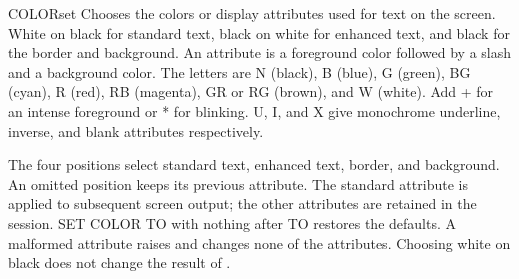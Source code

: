 \begin{XbaseEntry}{COLOR}{set}
Chooses the colors or display attributes used for text on the screen.
\Syntax
{}
\Defaults
White on black for standard text, black on white for enhanced text, and black
for the border and background.
\Usage
An attribute is a foreground color followed by a slash and a background color.
The letters are N (black), B (blue), G (green), BG (cyan), R (red), RB
(magenta), GR or RG (brown), and W (white). Add + for an intense foreground
or * for blinking. U, I, and X give monochrome underline, inverse, and blank
attributes respectively.

The four positions select standard text, enhanced text, border, and background.
An omitted position keeps its previous attribute. The standard attribute is
applied to subsequent screen output; the other attributes are retained in the
session. SET COLOR TO with nothing after TO restores the defaults. A malformed
attribute raises  and changes none of the attributes.
Choosing white on black does not change the result of .
\Examples
{}
\end{XbaseEntry}


